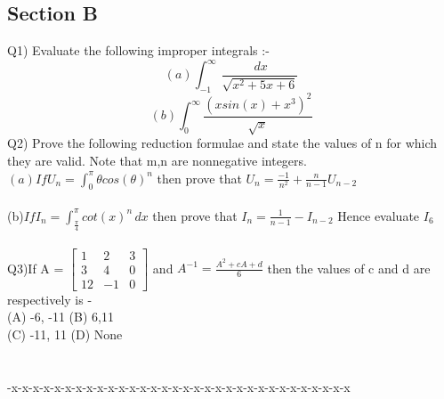 \documentclass[25pt]{article}
\begin{document}
\begin{large}
\section*{Section B}
Q1) Evaluate the following improper integrals :-
\begin{equation*}
(a) \int_{-1}^{\infty} \frac{\,dx}{\sqrt{x^2 +5x + 6}} 
\end{equation*}
\begin{equation*}
(b) \int_{0}^{\infty} \frac{(xsin(x) + x^3)^{2}}{\sqrt{x}}
\end{equation*}
Q2) Prove the following reduction formulae and state the values of n for which they are valid. Note that m,n are nonnegative integers.\\
$(a) If U_{n} = \int_{0}^{\pi} \theta cos(\theta)^n$ then prove that $U_{n} = \frac{-1}{n^2} + \frac{n}{n - 1}U_{n - 2}$\\\\
(b)$If I_{n} = \int_{\frac{\pi}{4}}^{\pi} cot(x)^n \,dx$ then prove that $I_{n} = \frac{1}{n - 1} - I_{n - 2}$ Hence evaluate $I_{6}$\\\\
Q3)If A = 
$
\begin{bmatrix}
1 & 2 & 3\\
3 & 4 & 0\\
12 & -1 & 0
\end{bmatrix}
$
and $A^{-1} = \frac{A^2 + cA + d}{6}$ then the values of c and d are respectively is -\\ 
(A) -6, -11 \hspace{5cm} (B) 6,11\\
(C) -11, 11 \hspace{5cm} (D) None\\
\\\\
-x-x-x-x-x-x-x-x-x-x-x-x-x-x-x-x-x-x-x-x-x-x-x-x-x-x-x-x-x-x-x-x
\end{large}
\end{document}
